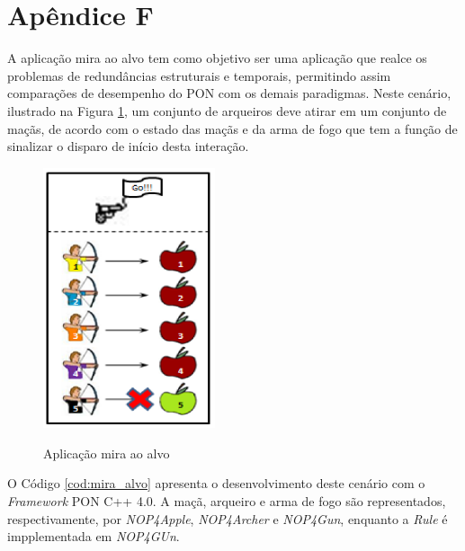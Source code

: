 


\chapter*{Apêndice F}\label{ap:apendice_mira_alvo}

A aplicação mira ao alvo tem como objetivo ser uma aplicação que realce os
problemas de redundâncias estruturais e temporais, permitindo assim comparações
de desempenho do PON com os demais paradigmas. Neste cenário, ilustrado na
Figura \ref{fig:mira_alvo2}, um conjunto de arqueiros deve atirar em um conjunto
de maçãs, de acordo com o estado das maçãs e da arma de fogo que tem a função de
sinalizar o disparo de início desta interação.

\begin{figure}[!htb]
\centering
\caption{Aplicação mira ao alvo}
\includegraphics[width=0.45\textwidth]{../figures/mira_alvo_2.PNG}
\smallskip
{}
\label{fig:mira_alvo2}
\end{figure}

O Código \ref{cod:mira_alvo} apresenta o desenvolvimento deste cenário com o
\textit{Framework} PON C++ 4.0. A maçã, arqueiro e arma de fogo são
representados, respectivamente, por \textit{NOP4Apple}, \textit{NOP4Archer} e
\textit{NOP4Gun}, enquanto a \textit{Rule} é impplementada em \textit{NOP4GUn}.
  
